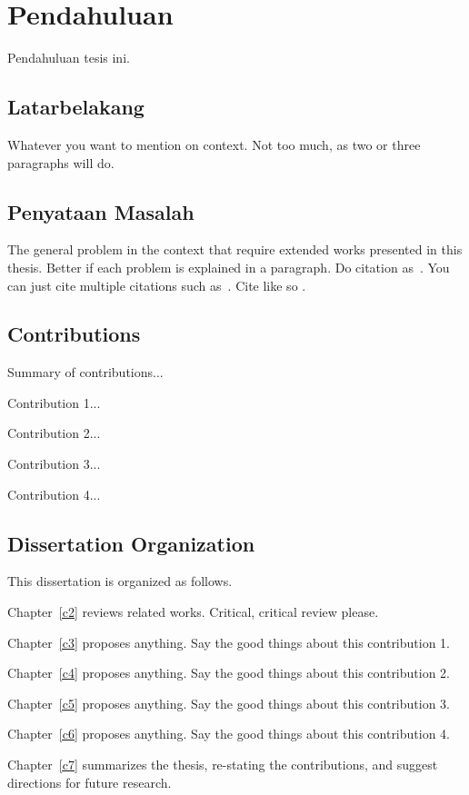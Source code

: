 \chapter{Pendahuluan}\label{c1}%
Pendahuluan tesis ini.

\section{Latarbelakang}
Whatever you want to mention on context. Not too much, as two or
three paragraphs will do.

\section{Penyataan Masalah}
The general problem in the context that require extended works
presented in this thesis. Better if each problem is explained in a
paragraph. Do citation as~\cite{b1}. You can just cite multiple
citations such as~\cite{j1, c1, w1}. Cite like so \cite{b1}.

\section{Contributions}
Summary of contributions...

Contribution 1...

Contribution 2...

Contribution 3...

Contribution 4...

\section{Dissertation Organization}
This dissertation is organized as follows.

Chapter~\ref{c2} reviews related works. Critical, critical review
please.

Chapter~\ref{c3} proposes anything. Say the good things about this
contribution 1.

Chapter~\ref{c4} proposes anything. Say the good things about this
contribution 2.

Chapter~\ref{c5} proposes anything. Say the good things about this
contribution 3.

Chapter~\ref{c6} proposes anything. Say the good things about this
contribution 4.

Chapter~\ref{c7} summarizes the thesis, re-stating the
contributions, and suggest directions for future research.
